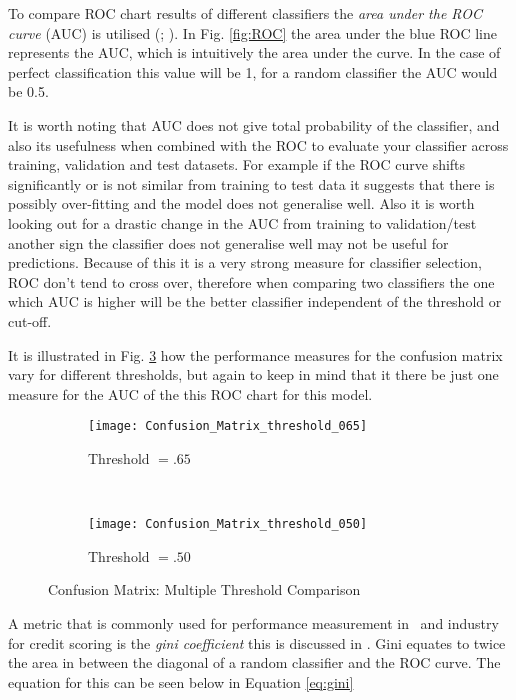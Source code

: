 To compare ROC chart results of different classifiers the \textit{area under the ROC curve} (AUC) is utilised (\cite{bradley_use_1997}; \cite{hanley_meaning_1982}). In Fig. \ref{fig:ROC} the area under the blue ROC line represents the AUC, which is intuitively the area under the curve. In the case of perfect classification this value will be 1, for a random classifier the AUC would be 0.5. 

It is worth noting that AUC does not give total probability of the classifier, and also its usefulness when combined with the ROC to evaluate your classifier across training, validation and test datasets. For example if the ROC curve shifts significantly or is not similar from training to test data it suggests that there is possibly over-fitting and the model does not generalise well. Also it is worth looking out for a drastic change in the AUC from training to validation/test another sign the classifier does not generalise well may not be useful for predictions. Because of this it is a very strong measure for classifier selection, ROC don't tend to cross over, therefore when comparing two classifiers the one which AUC is higher will be the better classifier independent of the threshold or cut-off.

It is illustrated in Fig. \ref{fig:matric_compare} how the performance measures for the confusion matrix vary for different thresholds, but again to keep in mind that it there be just one measure for the AUC of the this ROC chart for this model.

\begin{figure}[H]
	\centering
	\begin{subfigure}[b]{0.45\textwidth}
		\captionsetup{font=scriptsize}
		\texttt{[image: Confusion\_Matrix\_threshold\_065]}
		\caption{Threshold $=.65$}\label{fig:Threshold65}
	\end{subfigure} ~\quad
	\begin{subfigure}[b]{0.45\textwidth}
		\captionsetup{font=scriptsize}
		\texttt{[image: Confusion\_Matrix\_threshold\_050]}
		\caption{Threshold $=.50$}\label{fig:Threshold50}
	\end{subfigure}
	\caption{Confusion Matrix: Multiple Threshold Comparison}
	\label{fig:matric_compare}
\end{figure}

A metric that is commonly used for performance measurement in \subjectname\ and industry for credit scoring is the \textit{gini coefficient} this is discussed in \citep{hand_good_2005}. Gini equates to twice the area in between the diagonal of a random classifier and the ROC curve. The equation for this can be seen below in Equation \ref{eq:gini}

